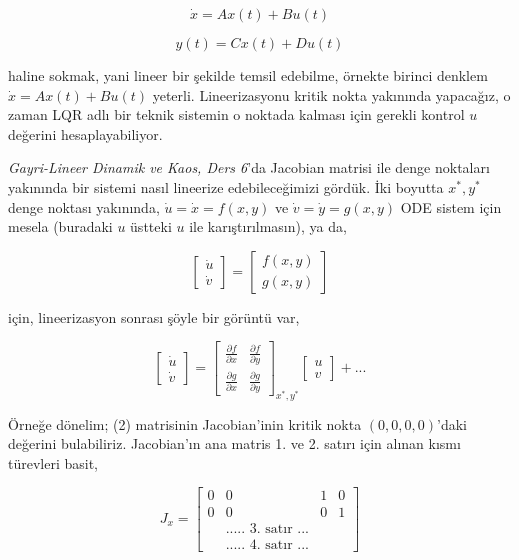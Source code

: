 \documentclass[12pt,fleqn]{article}\usepackage{../../common}
\begin{document}
$$
\dot{x} = Ax(t) + B u(t)
$$

$$
y(t) = C x(t) + D u(t)
$$

haline sokmak, yani lineer bir şekilde temsil edebilme, örnekte birinci
denklem $\dot{x} = Ax(t) + B u(t)$ yeterli. Lineerizasyonu kritik nokta
yakınında yapacağız, o zaman LQR adlı bir teknik sistemin o noktada kalması
için gerekli kontrol $u$ değerini hesaplayabiliyor.

{\em Gayri-Lineer Dinamik ve Kaos, Ders 6}'da Jacobian matrisi ile denge
noktaları yakınında bir sistemi nasıl lineerize edebileceğimizi gördük. İki
boyutta $x^*,y^*$ denge noktası yakınında, $\dot{u} = \dot{x} = f(x,y)$ ve
$\dot{v} = \dot{y} = g(x,y)$ ODE sistem için mesela (buradaki $u$ üstteki
$u$ ile karıştırılmasın), ya da,

$$
\left[\begin{array}{r}
\dot{u} \\ \dot{v}
\end{array}\right] = 
\left[\begin{array}{r}
f(x,y) \\ g(x,y)
\end{array}\right] 
$$

için, lineerizasyon sonrası şöyle bir görüntü var,

$$
\left[\begin{array}{r}
\dot{u} \\ \dot{v}
\end{array}\right]
=
\left[\begin{array}{rr}
\frac{\partial f}{\partial x} & \frac{\partial f}{\partial y} \\
\frac{\partial g}{\partial x} & \frac{\partial g}{\partial y} 
\end{array}\right]_{x^*,y^*}
\left[\begin{array}{r} u \\ v \end{array}\right]
+ ...
$$

Örneğe dönelim; (2) matrisinin Jacobian'inin kritik nokta $(0,0,0,0)$'daki
değerini bulabiliriz. Jacobian'ın ana matris 1. ve 2. satırı için alınan
kısmı türevleri basit,

$$
J_x = \left[\begin{array}{cccc}
0 & 0 & 1 & 0 \\
0 & 0 & 0 & 1 \\
& \textrm{..... 3. satır ...} &  &  \\ 
& \textrm{..... 4. satır ...} &  & 
\end{array}\right]
$$
\end{document}
